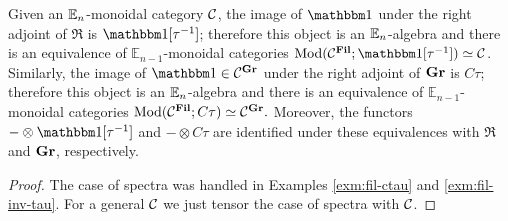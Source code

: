 


\begin{lem} \label{prop:mod-fil}
  Given an $\mathbb{E}_n$-monoidal category $\mathcal{C}$,
  the image of $\o$ under the right adjoint of $\Re$ is $\o[\tau^{-1}]$;
  therefore this object is an $\mathbb{E}_n$-algebra and there is an equivalence of $\mathbb{E}_{n-1}$-monoidal categories
  $ \Mod(\CC^{\Fil}; \o[\tau^{-1}]) \simeq \CC $.
  Similarly,
  the image of $\o \in \CC^{\Gr}$ under the right adjoint of $\operatorname{\mathbf{Gr}}$ is $C\tau$;
  therefore this object is an $\mathbb{E}_n$-algebra and there is an equivalence of $\mathbb{E}_{n-1}$-monoidal categories
  $ \mathrm{Mod}(\mathcal{C}^{\operatorname{\mathbf{Fil}}}; C\tau) \simeq \mathcal{C}^{\operatorname{\mathbf{Gr}}}. $
  Moreover, the functors $- \otimes \o[\tau^{-1}]$ and $- \otimes C\tau$ are identified under these equivalences with $\Re$ and $\operatorname{\mathbf{Gr}}$, respectively.
\end{lem}

\begin{proof}
  The case of spectra was handled in Examples \ref{exm:fil-ctau} and \ref{exm:fil-inv-tau}.
  For a general $\mathcal{C}$ we just tensor the case of spectra with $\mathcal{C}$.
\end{proof}
